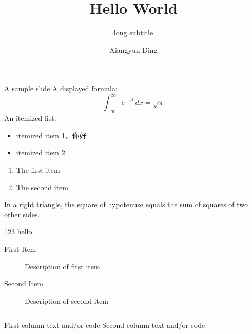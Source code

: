 \documentclass[10pt]{beamer}
\title{Hello World}
\subtitle[short subtitle]{long subtitle}
\author[dxy]{Xiangyun Ding}
\begin{document}
\frame{\titlepage}

\begin{frame}{A sample slide}
A displayed formula:
\[
  \int_{-\infty}^\infty e^{-x^2}\, dx = \sqrt{\pi}
\]
An itemized list:

\begin{itemize}
  \item itemized item 1，你好
  \item itemized item 2
\end{itemize}
\begin{enumerate}
  \item The first item
  \item The second item
\end{enumerate}

\end{frame}

\begin{frame}

\begin{theorem}{1.1}
  In a right triangle, \small{the square of hypotenuse equals
  the sum of squares of two} other sides.
\end{theorem}

\begin{block}{123}
  hello
\end{block}

\begin{description}
  \item[First Item] Description of first item
  \item[Second Item] Description of second item
\end{description}

\begin{columns}
  First column text and/or code
  Second column text and/or code
\end{columns}

\end{frame}
\end{document}
